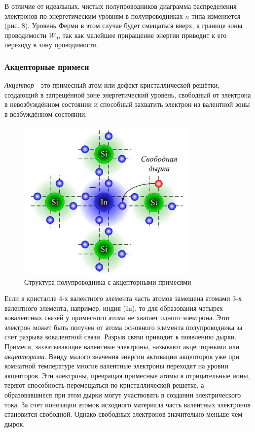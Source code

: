 	\par В отличие от идеальных, чистых полупроводников диаграмма распределения электронов по энергетическим уровням в полупроводниках \(n\)-типа изменяется (рис. 8). Уровень Ферми в этом случае будет смещаться вверх, к границе зоны проводимости \(W_п\), так как малейшее приращение энергии приводит к его переходу в зону проводимости.
	
	\subsubsection{Акцепторные примеси}
	
	\par \textit{Акцептор} - это примесный атом или дефект кристаллической решётки, создающий в запрещённой зоне энергетический уровень, свободный от электрона в невозбуждённом состоянии и способный захватить электрон из валентной зоны в возбуждённом состоянии.
	
	\begin{figure}[h]
		\centering
		\includegraphics[height=8cm]{img/10} 
		\captionsetup{font=footnotesize}
		\caption{Структура полупроводника с акцепторными примесями} 
	\end{figure}
	
	\par Если в кристалле 4-х валентного элемента часть атомов замещена атомами 3-х валентного элемента, например, индия (In), то для образования четырех ковалентных связей у примесного атома не хватает одного электрона. Этот электрон может быть получен от атома основного элемента полупроводника за счет разрыва ковалентной связи. Разрыв связи приводит к появлению дырки. Примеси, захватывающие валентные электроны, называют акцепторными или \textit{акцепторами}. Ввиду малого значения энергии активации акцепторов уже при комнатной температуре многие валентные электроны переходят на уровни акцепторов. Эти электроны, превращая примесные атомы в отрицательные ионы, теряют способность перемещаться по кристаллической решетке, а образовавшиеся при этом дырки могут участвовать в создании электрического тока. За счет ионизации атомов исходного материала часть валентных электронов становится свободной. Однако свободных электронов значительно меньше чем дырок.
	

